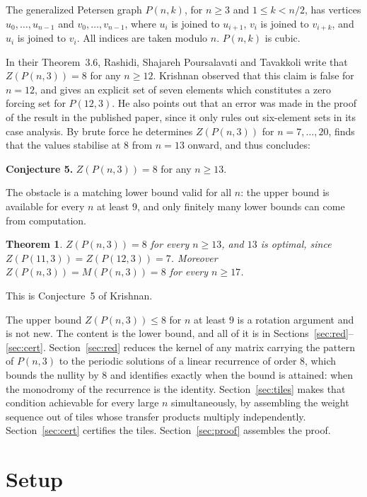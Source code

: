 \documentclass[11pt]{article}
\newtheorem{theorem}{Theorem}
\theoremstyle{definition}
\begin{document}
The generalized Petersen graph $P(n,k)$, for $n\ge3$ and $1\le k<n/2$, has
vertices $u_0,\dots,u_{n-1}$ and $v_0,\dots,v_{n-1}$, where $u_i$ is joined to
$u_{i+1}$, $v_i$ is joined to $v_{i+k}$, and $u_i$ is joined to $v_i$. All
indices are taken modulo $n$. $P(n,k)$ is cubic.

In their Theorem~3.6, Rashidi, Shajareh Poursalavati and Tavakkoli \cite{rst}
write that $Z(P(n,3))=8$ for any $n\ge12$. Krishnan \cite{k} observed that this
claim is false for $n=12$, and gives an explicit set of seven elements which
constitutes a zero forcing set for $P(12,3)$. He also points out that an error
was made in the proof of the result in the published paper, since it only rules
out six-element sets in its case analysis.
By brute force he determines $Z(P(n,3))$ for $n=7,\dots,20$, finds that the
values stabilise at $8$ from $n=13$ onward, and thus concludes:

\medskip
\noindent\textbf{Conjecture 5.} $Z(P(n,3))=8$ for any $n\ge13$.
\medskip

The obstacle is a matching lower bound valid for all $n$: the upper bound is
available for every $n$ at least $9$, and only finitely many lower bounds can
come from computation.

\begin{theorem}\label{thm:main}
$Z(P(n,3))=8$ for every $n\ge13$, and $13$ is optimal, since
$Z(P(11,3))=Z(P(12,3))=7$. Moreover $Z(P(n,3))=M(P(n,3))=8$ for every $n\ge17$.
\end{theorem}

This is Conjecture~5 of Krishnan.

The upper bound $Z(P(n,3))\le8$ for $n$ at least $9$ is a rotation argument and
is not new. The content is the lower bound, and all of it is in
Sections~\ref{sec:red}--\ref{sec:cert}. Section~\ref{sec:red} reduces the kernel
of any matrix carrying the pattern of $P(n,3)$ to the periodic solutions of a
linear recurrence of order $8$, which bounds the nullity by $8$ and identifies
exactly when the bound is attained: when the monodromy of the recurrence is the
identity. Section~\ref{sec:tiles} makes that condition achievable for every
large $n$ simultaneously, by assembling the weight sequence out of tiles whose
transfer products multiply independently. Section~\ref{sec:cert} certifies the
tiles. Section~\ref{sec:proof} assembles the proof.

\section{Setup}\label{sec:setup}
\end{document}
